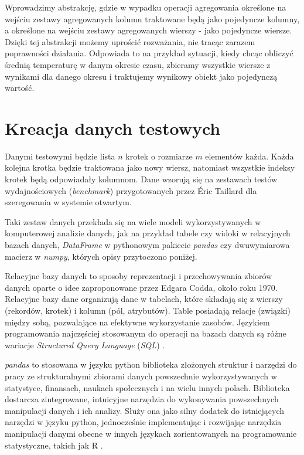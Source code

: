 \documentclass[brudnopis]{xmgr}
\begin{document}
Wprowadzimy abstrakcję, gdzie w wypadku operacji agregowania określone na wejściu zestawy agregowanych kolumn traktowane będą jako pojedyncze kolumny, a określone na wejściu zestawy agregowanych wierszy - jako pojedyncze wiersze. Dzięki tej abstrakcji możemy uprościć rozważania, nie tracąc zarazem poprawności działania. Odpowiada to na przykład sytuacji, kiedy chcąc obliczyć średnią temperaturę w danym okresie czasu, zbieramy wszystkie wiersze z wynikami dla danego okresu i traktujemy wynikowy obiekt jako pojedynczą wartość.


\section{Kreacja danych testowych}

Danymi testowymi będzie lista $n$ krotek o rozmiarze $m$ elementów każda.
Każda kolejna krotka będzie traktowana jako nowy wiersz, natomiast wszystkie indeksy krotek będą odpowiadały kolumnom. Dane wzorują się na zestawach testów wydajnościowych (\emph{benchmark}) przygotowanych przez Éric Taillard \cite{taillard1993benchmarks} dla szeregowania w systemie otwartym.
\medskip

Taki zestaw danych przekłada się na wiele modeli wykorzystywanych w komputerowej analizie danych, jak na przykład tabele czy widoki w relacyjnych bazach danych, \emph{DataFrame} w pythonowym pakiecie \emph{pandas} czy dwuwymiarowa macierz w \emph{numpy}, których opisy przytoczono poniżej.
\medskip

Relacyjne bazy danych to sposoby reprezentacji i przechowywania zbiorów danych oparte o idee zaproponowane przez Edgara Codda, około roku 1970. Relacyjne bazy dane organizują dane w tabelach, które składają się z wierszy (rekordów, krotek) i kolumn (pól, atrybutów). Table posiadają relacje (związki) między sobą, pozwalające na efektywne wykorzystanie zasobów. Językiem programowania najczęściej stosowanym do operacji na bazach danych są różne wariacje \emph{Structured Query Language} (\emph{SQL}) \cite{RDB1:2020:X} \cite{RDB2:2020:X} \cite{RDB3:2010:X}.
\medskip

\emph{pandas} to stosowana w języku python biblioteka złożonych struktur i narzędzi do pracy ze strukturalnymi zbiorami danych powszechnie wykorzystywanych w statystyce, finansach, naukach społecznych i na wielu innych polach. Biblioteka dostarcza zintegrowane, intuicyjne narzędzia do wykonywania powszechnych manipulacji danych i ich analizy. Służy ona jako silny dodatek do istniejących narzędzi w języku python, jednocześnie implementując i rozwijając narzędzia manipulacji danymi obecne w innych językach zorientowanych na programowanie statystyczne, takich jak R \cite{PANDAS1:2011:X} \cite{PANDAS2:2020:X}.
\medskip
\end{document}
